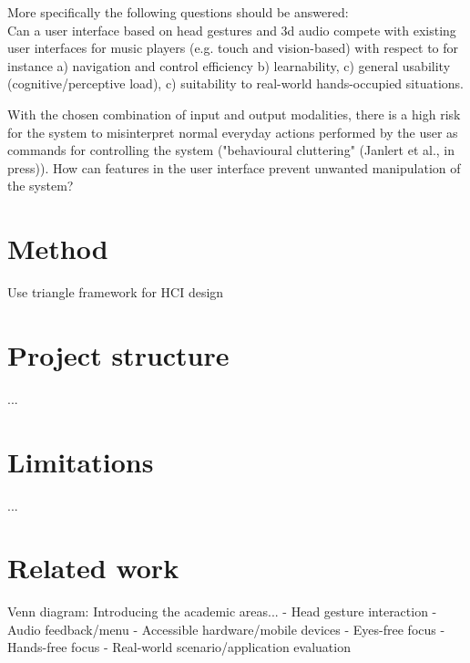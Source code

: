More specifically the following questions should be answered:\\
Can a user interface based on head gestures and 3d audio compete with existing user interfaces for music players (e.g. touch and vision-based) with respect to for instance a) navigation and control efficiency b) learnability, c) general usability (cognitive/perceptive load), c) suitability to real-world hands-occupied situations. 

With the chosen combination of input and output modalities, there is a high risk for the system to misinterpret normal everyday actions performed by the user as commands for controlling the system ("behavioural cluttering" (Janlert et al., in press)). How can features in the user interface prevent unwanted manipulation of the system?

\section{Method}
Use triangle framework for HCI design \cite{mackay_hci_1997}


\section{Project structure}
...

\section{Limitations}
...

\section{Related work}
Venn diagram: Introducing the academic areas...
- Head gesture interaction
- Audio feedback/menu
- Accessible hardware/mobile devices
- Eyes-free focus
- Hands-free focus
- Real-world scenario/application evaluation

